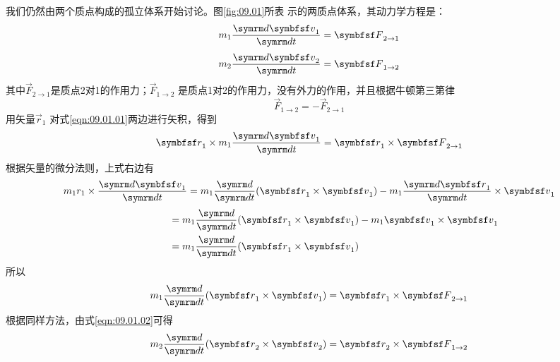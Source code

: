 我们仍然由两个质点构成的孤立体系开始讨论。图\ref{fig:09.01}所表
示的两质点体系，其动力学方程是：
\begin{equation}\label{eqn:09.01.01}
  m _ { 1 } \frac { \dif \vec{v} _ { 1 } } { \dif t } = \vec{F} _ { 2 \to 1 }
\end{equation}
\begin{equation}\label{eqn:09.01.02}
  m _ { 2 } \frac { \dif \vec{v} _ { 2 } } { \dif t } = \vec{F} _ { 1 \to 2 }
\end{equation}
其中$\vec{F} _ { 2 \to 1 }$是质点2对1的作用力；$\vec{F} _ { 1 \to 2 }$
是质点1对2的作用力，没有外力的作用，并且根据牛顿第三第律
\begin{equation}\label{eqn:09.01.03}
  \vec{F} _ { 1 \to 2 } = - \vec{F} _ { 2 \to 1 }
\end{equation}
用矢量$\vec{r} _ { 1 }$ 对式\eqref{eqn:09.01.01}两边进行矢积，得到
\begin{equation*}
  \vec{r} _ { 1 } \times m _ { 1 } \frac { \dif \vec{v} _ { 1 } } { \dif t } = \vec{r} _ { 1 } \times \vec{F} _ { 2 \to 1 }
\end{equation*}
根据矢量的微分法则，上式右边有
\begin{equation*}
  m _ 1 r _ { 1 } \times \frac { \dif \vec{v}_ { 1 } } { \dif t } = m _ { 1 } \frac { \dif } { \dif t } ( \vec{r} _ { 1 } \times \vec{v} _ { 1 }) - m _ { 1 } \frac { \dif \vec{r} _ { 1 } } { \dif t} \times \vec{v} _ { 1 }
\end{equation*}
\clearpage\mbox{}\vspace{-2em}
\begin{equation*}
  \begin{aligned}
    \hspace{5em} & = m _ { 1 } \frac { \dif } { \dif t } ( \vec{r} _ { 1 } \times \vec{v} _ { 1 } ) - m _ { 1 } \vec{v} _ { 1 } \times \vec{v} _ { 1 } \\
                 & = m _ { 1 } \frac { \dif } { \dif t } ( \vec{r} _ { 1 } \times \vec{v} _ { 1 } )
  \end{aligned}
\end{equation*}
所以
\begin{equation}\label{eqn:09.01.04}
  m _{ 1 } \frac { \dif }{\dif t } ( \vec{r} _ { 1 } \times \vec{v} _ { 1 } ) = \vec{r} _ { 1 } \times \vec{F} _ { 2 \to 1 }
\end{equation}
根据同样方法，由式\eqref{eqn:09.01.02}可得
\begin{equation}\label{eqn:09.01.05}
  m _{ 2 } \frac { \dif }{\dif t } ( \vec{r} _ { 2 } \times \vec{v} _ { 2 } ) = \vec{r} _ { 2 } \times \vec{F} _ { 1 \to 2 }
\end{equation}
